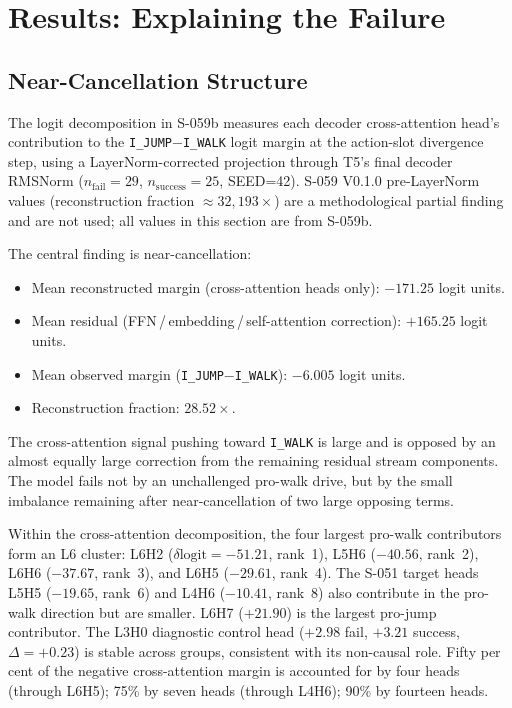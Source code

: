 \section{Results: Explaining the Failure}
\label{sec:explaining}

\subsection{Near-Cancellation Structure}

The logit decomposition in S-059b measures each decoder cross-attention head's
contribution to the \texttt{I\_JUMP}$-$\texttt{I\_WALK} logit margin at the action-slot
divergence step, using a LayerNorm-corrected projection through T5's final decoder
RMSNorm ($n_\text{fail}=29$, $n_\text{success}=25$, SEED=42).
S-059 V0.1.0 pre-LayerNorm values (reconstruction fraction $\approx 32{,}193\times$)
are a methodological partial finding and are not used; all values in this section are
from S-059b.

The central finding is near-cancellation:
\begin{itemize}
  \item Mean reconstructed margin (cross-attention heads only): $-171.25$ logit units.
  \item Mean residual (FFN\,/\,embedding\,/\,self-attention correction): $+165.25$ logit units.
  \item Mean observed margin (\texttt{I\_JUMP}$-$\texttt{I\_WALK}): $-6.005$ logit units.
  \item Reconstruction fraction: $28.52\times$.
\end{itemize}
The cross-attention signal pushing toward \texttt{I\_WALK} is large and is opposed by
an almost equally large correction from the remaining residual stream components.
The model fails not by an unchallenged pro-walk drive, but by the small imbalance
remaining after near-cancellation of two large opposing terms.

Within the cross-attention decomposition, the four largest pro-walk contributors form
an L6 cluster: L6H2 ($\delta\mathrm{logit}=-51.21$, rank~1), L5H6 ($-40.56$, rank~2),
L6H6 ($-37.67$, rank~3), and L6H5 ($-29.61$, rank~4).
The S-051 target heads L5H5 ($-19.65$, rank~6) and L4H6 ($-10.41$, rank~8) also
contribute in the pro-walk direction but are smaller.
L6H7 ($+21.90$) is the largest pro-jump contributor.
The L3H0 diagnostic control head ($+2.98$ fail, $+3.21$ success, $\Delta=+0.23$) is
stable across groups, consistent with its non-causal role.
Fifty per cent of the negative cross-attention margin is accounted for by four heads
(through L6H5); 75\% by seven heads (through L4H6); 90\% by fourteen heads.

